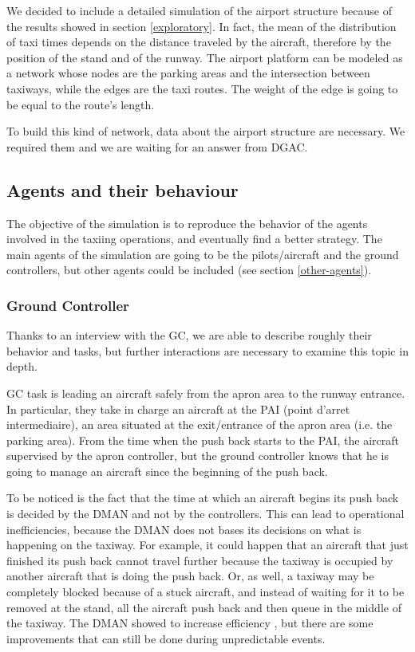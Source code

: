 \documentclass{article}
\begin{document}
We decided to include a detailed simulation of the airport structure because of the results showed in section \ref{exploratory}. In fact, the mean of the distribution of taxi times depends on the distance traveled by the aircraft, therefore by the position of the stand and of the runway. The airport platform can be modeled as a network whose nodes are the parking areas and the intersection between taxiways, while the edges are the taxi routes. The weight of the edge is going to be equal to the route's length.

To build this kind of network, data about the airport structure are necessary. We required them and we are waiting for an answer from DGAC.

\subsection{Agents and their behaviour}
The objective of the simulation is to reproduce the behavior of the agents involved in the taxiing operations, and eventually find a better strategy. 
The main agents of the simulation are going to be the pilots/aircraft and the ground controllers, but other agents could be included (see section  \ref{other-agents}).

\subsubsection{Ground Controller}

Thanks to an interview with the GC, we are able to describe roughly their behavior and tasks, but further interactions are necessary to examine this topic in depth. 

GC task is leading an aircraft safely from the apron area to the runway entrance. In particular, they take in charge an aircraft at the PAI (point d'arret intermediaire), an area situated at the exit/entrance of the apron area (i.e. the parking area). From the time when the push back starts to the PAI, the aircraft supervised by the apron controller, but the ground controller knows that he is going to manage an aircraft since the beginning of the push back. 

To be noticed is the fact that the time at which an aircraft begins its push back is decided by the DMAN and not by the controllers. This can lead to operational inefficiencies, because the DMAN does not bases its decisions on what is happening on the taxiway. For example, it could happen that an aircraft that just finished its push back cannot travel further because the taxiway is occupied by another aircraft that is doing the push back. Or, as well, a taxiway may be completely blocked because of a stuck aircraft, and instead of waiting for it to be removed at the stand, all the aircraft push back and then queue in the middle of the taxiway. The DMAN showed to increase efficiency \cite{manual}, but there are some improvements that can still be done during unpredictable events.
\end{document}
